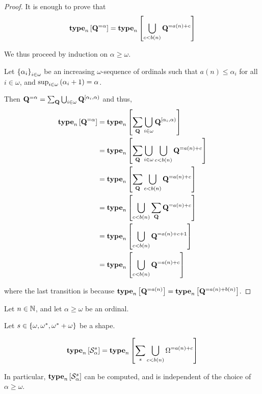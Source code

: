 \begin{proof}
    It is enough to prove that
    \[
        \mathbf{type}_{n} \left[ {\mathbf{Q}^{= \alpha}} \right] = \mathbf{type}_{n} \left[ {\bigcup_{c < b(n)}{\mathbf{Q}^{= a(n) + c}}} \right]
    \]

    We thus proceed by induction on $\alpha \ge \omega$.

    Let $\left\{ {\alpha_i} \right\}_{i \in \omega}$ be an increasing $\omega$-sequence of ordinals
    such that $a(n) \le \alpha_i$ for all $i \in \omega$,
    and $\sup_{i \in \omega} \left( {\alpha_i + 1} \right) = \alpha$.

    Then $\mathbf{Q}^{= \alpha} = \sum_{\mathbf{Q}}{\bigcup_{i \in \omega} \mathbf{Q}^{[\alpha_i, \alpha)}}$ and thus,
    \begin{align*}
        \mathbf{type}_{n} \left[ {\mathbf{Q}^{= \alpha}} \right]
         & = \mathbf{type}_{n} \left[ {\sum_{\mathbf{Q}} \bigcup_{i \in \omega} \mathbf{Q}^{[\alpha_i, \alpha)}} \right]             \\
         & = \mathbf{type}_{n} \left[ {\sum_{\mathbf{Q}} \bigcup_{i \in \omega} \bigcup_{c < b(n)}{\mathbf{Q}^{= a(n) + c}}} \right] \\
         & = \mathbf{type}_{n} \left[ {\sum_{\mathbf{Q}} \bigcup_{c < b(n)}{\mathbf{Q}^{= a(n) + c}}} \right]                        \\
         & = \mathbf{type}_{n} \left[ {\bigcup_{c < b(n)}{\sum_{\mathbf{Q}} \mathbf{Q}^{= a(n) + c}}} \right]                        \\
         & = \mathbf{type}_{n} \left[ {\bigcup_{c < b(n)}{\mathbf{Q}^{= a(n) + c + 1}}} \right]                               \\
         & = \mathbf{type}_{n} \left[ {\bigcup_{c < b(n)}{\mathbf{Q}^{= a(n) + c}}} \right]
    \end{align*}

    where the last transition is because $\mathbf{type}_{n} \left[ {\mathbf{Q}^{= a(n)}} \right] = \mathbf{type}_{n} \left[ {\mathbf{Q}^{= a(n) + b(n)}} \right]$.
\end{proof}

\begin{corollary}
    Let $n \in \mathbb{N}$, and let $\alpha \ge \omega$ be an ordinal.

    Let $s \in \left\{ {\omega, \omega^\ast, \omega^\ast + \omega} \right\}$ be a shape.

    \[
        \mathbf{type}_{n} \left[ {\mathcal{S}^{s}_{\alpha}} \right]
        = \mathbf{type}_{n} \left[ {\sum_{s} {\bigcup_{c < b(n)}{\Omega^{= a(n) + c}}}} \right]
    \]

    In particular, $\mathbf{type}_{n} \left[ {\mathcal{S}^{s}_{\alpha}} \right]$ can be
    computed, and is independent of the choice of $\alpha \ge \omega$.
\end{corollary}

